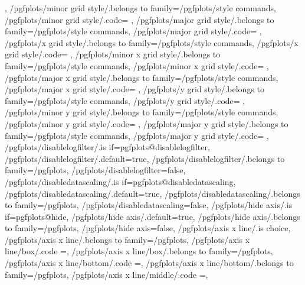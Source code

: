 {{		%
	},
	/pgfplots/minor grid style/.belongs to family=/pgfplots/style commands,
	/pgfplots/minor grid style/.code={%
	},
	/pgfplots/major grid style/.belongs to family=/pgfplots/style commands,
	/pgfplots/major grid style/.code={%
	},
	/pgfplots/x grid style/.belongs to family=/pgfplots/style commands,
	/pgfplots/x grid style/.code={%
	},
	/pgfplots/minor x grid style/.belongs to family=/pgfplots/style commands,
	/pgfplots/minor x grid style/.code={%
	},
	/pgfplots/major x grid style/.belongs to family=/pgfplots/style commands,
	/pgfplots/major x grid style/.code={%
	},
	/pgfplots/y grid style/.belongs to family=/pgfplots/style commands,
	/pgfplots/y grid style/.code={%
	},
	/pgfplots/minor y grid style/.belongs to family=/pgfplots/style commands,
	/pgfplots/minor y grid style/.code={%
	},
	/pgfplots/major y grid style/.belongs to family=/pgfplots/style commands,
	/pgfplots/major y grid style/.code={%
	},
	/pgfplots/disablelogfilter/.is if=pgfplots@disablelogfilter,
	/pgfplots/disablelogfilter/.default=true,
	/pgfplots/disablelogfilter/.belongs to family=/pgfplots,
	/pgfplots/disablelogfilter=false,
	/pgfplots/disabledatascaling/.is if=pgfplots@disabledatascaling,
	/pgfplots/disabledatascaling/.default=true,
	/pgfplots/disabledatascaling/.belongs to family=/pgfplots,
	/pgfplots/disabledatascaling=false,
	/pgfplots/hide axis/.is if=pgfplots@hide,
	/pgfplots/hide axis/.default=true,
	/pgfplots/hide axis/.belongs to family=/pgfplots,
	/pgfplots/hide axis=false,
	/pgfplots/axis x line/.is choice,
	/pgfplots/axis x line/.belongs to family=/pgfplots, %
	/pgfplots/axis x line/box/.code	={\def\pgfplots@xaxislinesnum{0}\def\pgfplots@xtickposnum{0}},
	/pgfplots/axis x line/box/.belongs to family=/pgfplots, %
	/pgfplots/axis x line/bottom/.code	={\def\pgfplots@xaxislinesnum{1}\def\pgfplots@xtickposnum{1}},
	/pgfplots/axis x line/bottom/.belongs to family=/pgfplots, %
	/pgfplots/axis x line/middle/.code	={\def\pgfplots@xaxislinesnum{2}\def\pgfplots@xtickposnum{2}},
}
